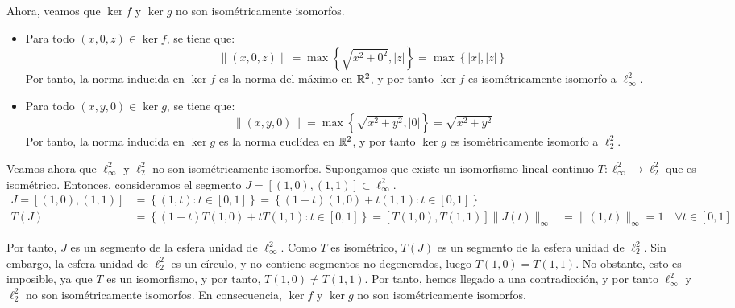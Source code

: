 \begin{ejercicio}
    Ahora, veamos que $\ker f$ y $\ker g$ no son isométricamente isomorfos.
    \begin{itemize}
        \item Para todo $(x, 0, z) \in \ker f$, se tiene que:
        \begin{equation*}
            \|(x, 0, z)\| = \max\left\{\sqrt{x^2 + 0^2}, |z|\right\} = \max\left\{|x|, |z|\right\}
        \end{equation*}
        Por tanto, la norma inducida en $\ker f$ es la norma del máximo en $\mathbb{R}^2$, y por tanto $\ker f$ es isométricamente isomorfo a $\ell_\infty^2$.
        \item Para todo $(x, y, 0) \in \ker g$, se tiene que:
        \begin{equation*}
            \|(x, y, 0)\| = \max\left\{\sqrt{x^2 + y^2}, |0|\right\} = \sqrt{x^2 + y^2}
        \end{equation*}
        Por tanto, la norma inducida en $\ker g$ es la norma euclídea en $\mathbb{R}^2$, y por tanto $\ker g$ es isométricamente isomorfo a $\ell_2^2$.
    \end{itemize}
    
    Veamos ahora que $\ell_\infty^2$ y $\ell_2^2$ no son isométricamente isomorfos. Supongamos que existe un isomorfismo lineal continuo $T: \ell_\infty^2 \longrightarrow \ell_2^2$ que es isométrico. Entonces, consideramos el segmento $J=[(1, 0), (1, 1)] \subset \ell_\infty^2$.
    \begin{align*}
        J=[(1, 0), (1, 1)] &= \left\{(1, t) : t \in [0, 1]\right\} = \left\{(1-t)(1, 0) + t(1, 1) : t \in [0, 1]\right\}\\
        T(J) &= \left\{(1-t)T(1, 0) + tT(1, 1) : t \in [0, 1]\right\} = [T(1, 0), T(1, 1)]
        \|J(t)\|_\infty &= \|(1, t)\|_\infty = 1 \quad \forall t \in [0, 1]
    \end{align*}

    Por tanto, $J$ es un segmento de la esfera unidad de $\ell_\infty^2$. Como $T$ es isométrico, $T(J)$ es un segmento de la esfera unidad de $\ell_2^2$. Sin embargo, la esfera unidad de $\ell_2^2$ es un círculo, y no contiene segmentos no degenerados, luego $T(1,0)=T(1,1)$. No obstante, esto es imposible, ya que $T$ es un isomorfismo, y por tanto, $T(1,0) \neq T(1,1)$. Por tanto, hemos llegado a una contradicción, y por tanto $\ell_\infty^2$ y $\ell_2^2$ no son isométricamente isomorfos. En consecuencia, $\ker f$ y $\ker g$ no son isométricamente isomorfos.
\end{ejercicio}

